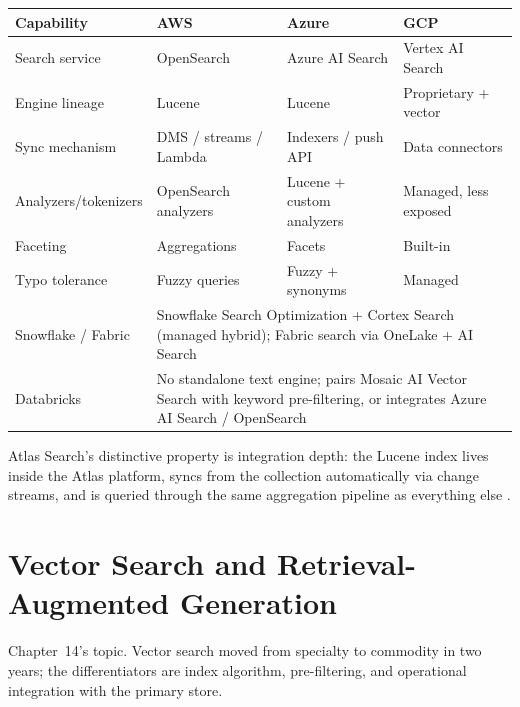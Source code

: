 \begin{center}
\footnotesize
\begin{tabular}{@{}p{2.9cm}p{3.0cm}p{3.0cm}p{3.0cm}@{}}
\toprule
\textbf{Capability} & \textbf{AWS} & \textbf{Azure} & \textbf{GCP} \\
\midrule
Search service & OpenSearch & Azure AI Search & Vertex AI Search \\
Engine lineage & Lucene & Lucene & Proprietary + vector \\
Sync mechanism & DMS / streams / Lambda & Indexers / push API & Data connectors \\
Analyzers/tokenizers & OpenSearch analyzers & Lucene + custom analyzers & Managed, less exposed \\
Faceting & Aggregations & Facets & Built-in \\
Typo tolerance & Fuzzy queries & Fuzzy + synonyms & Managed \\
\addlinespace
Snowflake / Fabric & \multicolumn{3}{l}{Snowflake Search Optimization + Cortex Search (managed hybrid); Fabric search via OneLake + AI Search} \\
Databricks & \multicolumn{3}{l}{No standalone text engine; pairs Mosaic AI Vector Search with keyword pre-filtering, or integrates Azure AI Search / OpenSearch} \\
\bottomrule
\end{tabular}
\end{center}

\noindent Atlas Search's distinctive property is integration depth: the Lucene index lives inside
the Atlas platform, syncs from the collection automatically via change streams, and is queried
through the same aggregation pipeline as everything else \cite{mongodbAtlasSearchDocs,apacheLuceneRepo}.

\section{Vector Search and Retrieval-Augmented Generation}
%
Chapter~14's topic. Vector search moved from specialty to commodity in two years; the
differentiators are index algorithm, pre-filtering, and operational integration with the primary
store.

